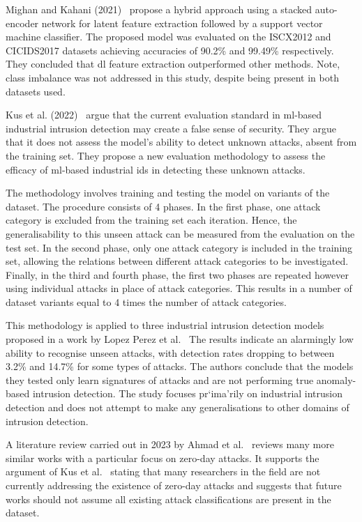 Mighan and Kahani (2021)~\cite{Mighan} propose a hybrid approach using a
stacked auto-encoder network for latent feature extraction followed by a
support vector machine classifier. The proposed model was evaluated on the
ISCX2012 and CICIDS2017 datasets achieving accuracies of 90.2\% and 99.49\%
respectively. They concluded that \gls{dl} feature extraction outperformed
other methods. Note, class imbalance was not addressed in this study, despite
being present in both datasets used.

Kus et al. (2022)~\cite{Kus} argue that the current evaluation standard in
\gls{ml}-based industrial intrusion detection may create a false sense of
security. They argue that it does not assess the model's ability to detect
unknown attacks, absent from the training set. They propose a new evaluation
methodology to assess the efficacy of \gls{ml}-based industrial \gls{ids} in
detecting these unknown attacks.

The methodology involves training and testing the model on variants of the
dataset. The procedure consists of 4 phases. In the first phase, one attack
category is excluded from the training set each iteration. Hence, the
generalisability to this unseen attack can be measured from the evaluation on
the test set. In the second phase, only one attack category is included in the
training set, allowing the relations between different attack categories to be
investigated. Finally, in the third and fourth phase, the first two phases are
repeated however using individual attacks in place of attack categories. This
results in a number of dataset variants equal to 4 times the number of attack
categories.

This methodology is applied to three industrial intrusion detection models
proposed in a work by Lopez Perez et al.~\cite{Perez} The results indicate an
alarmingly low ability to recognise unseen attacks, with detection rates
dropping to between 3.2\% and 14.7\% for some types of attacks. The authors
conclude that the models they tested only learn signatures of attacks and are
not performing true anomaly-based intrusion detection. The study focuses
pr`ima'rily on industrial intrusion detection and does not attempt to make any
generalisations to other domains of intrusion detection.

A literature review carried out in 2023 by Ahmad et al.~\cite{zero-day} reviews
many more similar works with a particular focus on zero-day attacks. It
supports the argument of Kus et al.~\cite{Kus} stating that many researchers in
the field are not currently addressing the existence of zero-day attacks and
suggests that future works should not assume all existing attack
classifications are present in the dataset.

